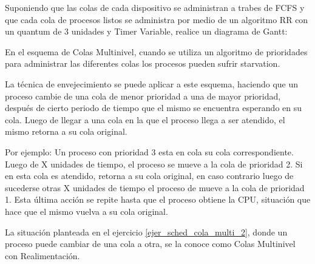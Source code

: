 \begin{questions}
Suponiendo que las colas de cada dispositivo se administran a trabes de FCFS y que cada cola de procesos listos se administra por medio de un algoritmo RR con un quantum de 3 unidades y Timer Variable, realice un diagrama de Gantt:

\question En el esquema de Colas Multinivel, cuando se utiliza un algoritmo de prioridades para administrar las diferentes colas los procesos pueden sufrir starvation. \label{ejer_sched_cola_multi_2}

\hspace{20pt} La técnica de envejecimiento se puede aplicar a este esquema, haciendo que un proceso cambie de una cola de menor prioridad a una de mayor prioridad, después de cierto periodo de tiempo que el mismo se encuentra esperando en su cola. Luego de llegar a una cola en la que el proceso llega a ser atendido, el mismo retorna a su cola original.

\hspace{20pt} Por ejemplo: Un proceso con prioridad 3 esta en cola su cola correspondiente. Luego de X unidades de tiempo, el proceso se mueve a la cola de prioridad 2. Si en esta cola es atendido, retorna a su cola original, en caso contrario luego de sucederse otras X unidades de tiempo el proceso de mueve a la cola de prioridad 1. Esta última acción se repite hasta que el proceso obtiene la CPU, situación que hace que el mismo vuelva a su cola original.

\question La situación planteada en el ejercicio \ref{ejer_sched_cola_multi_2}, donde un proceso puede cambiar de una cola a otra, se la conoce como Colas Multinivel con Realimentación.


\end{questions}
